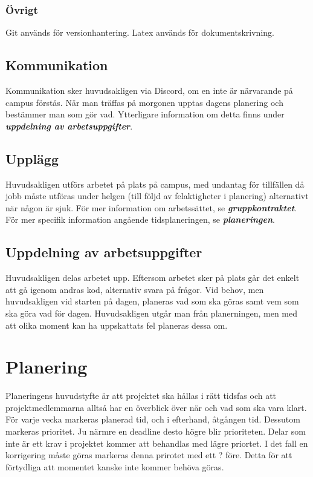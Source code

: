 \documentclass{TDP003mall}
\begin{document}
\subsubsection{Övrigt}
Git används för versionhantering. Latex används för dokumentskrivning. 

\subsection{Kommunikation}
Kommunikation sker huvudsakligen via Discord, om en inte är närvarande på campus förstås. När man träffas på morgonen upptas dagens 
planering och bestämmer man som gör vad. Ytterligare information om detta finns under \textbf{\textit{uppdelning av arbetsuppgifter}}.

\subsection{Upplägg}
Huvudsakligen utförs arbetet på plats på campus, med undantag för tillfällen då jobb måste utföras under helgen (till följd av felaktigheter i planering)
alternativt när någon är sjuk. För mer information om arbetssättet, se \textbf{\textit{gruppkontraktet}}. För mer specifik information angående tidsplaneringen, 
se \textbf{\textit{planeringen}}. 

\subsection{Uppdelning av arbetsuppgifter}
Huvudsakligen delas arbetet upp. Eftersom arbetet sker på plats går det enkelt att gå igenom andras kod, alternativ svara på frågor. 
Vid behov, men huvudsakligen vid starten på dagen, planeras vad som ska göras samt vem som ska göra vad för dagen. Huvudsakligen utgår man från
planerningen, men med att olika moment kan ha uppskattats fel planeras dessa om. 

\section{Planering}
Planeringens huvudstyfte är att projektet ska hållas i rätt tidsfas och att projektmedlemmarna alltså har en överblick över när och vad som ska vara klart.
För varje vecka markeras planerad tid, och i efterhand, åtgången tid. Dessutom markeras prioritet. Ju närmre en deadline desto högre blir prioriteten.
Delar som inte är ett krav i projektet kommer att behandlas med lägre priortet. I det fall en korrigering måste göras markeras denna prirotet med ett ? före. Detta för
att förtydliga att momentet kanske inte kommer behöva göras.
\end{document}
